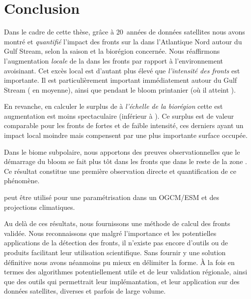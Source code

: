 
\chapter{Conclusion}
\label{chp:conclusion}

Dans le cadre de cette thèse, grâce à 20~années de données satellites nous avons montré et \emph{quantifié} l'impact des fronts sur la  dans l'Atlantique Nord autour du Gulf Stream, selon la saison et la biorégion concernée.
Nous réaffirmons l'augmentation \emph{locale} de la  dans les fronts par rapport à l'environnement avoisinant.
Cet excès local est d'autant plus élevé que \emph{l'intensité des fronts} est importante.
Il est particulièrement important immédiatement autour du Gulf Stream ( en moyenne), ainsi que pendant le bloom printanier (où il atteint ).

En revanche, en calculer le surplus de  à \emph{l'échelle de la biorégion}  cette est augmentation est moins spectaculaire (inférieur à ).
Ce surplus est de valeur comparable pour les fronts de fortes et de faible intensité, ces derniers ayant un impact local moindre mais compensent par une plus importante surface occupée.

Dans le biome subpolaire, nous apportons des preuves observationnelles que le démarrage du bloom se fait plus tôt dans les fronts que dans le reste de la zone .
Ce résultat constitue une première observation directe et quantification de ce phénomène.

peut être utilisé pour une paramétrisation dans un OGCM/ESM et des projections climatiques.

Au delà de ces résultats, nous fournissons une méthode de calcul des fronts validée.
Nous reconnaissons que malgré l'importance et les potentielles applications de la détection des fronts, il n'existe pas encore d'outils ou de produits facilitant leur utilisation scientifique.
Sans fournir y une solution définitive nous avons néanmoins pu mieux en délimiter la forme.
À la fois en termes des algorithmes potentiellement utile et de leur validation régionale, ainsi que des outils qui permettrait leur implémantation, et leur application sur des données satellites, diverses et parfois de large volume.

\fancybreakdisplay
